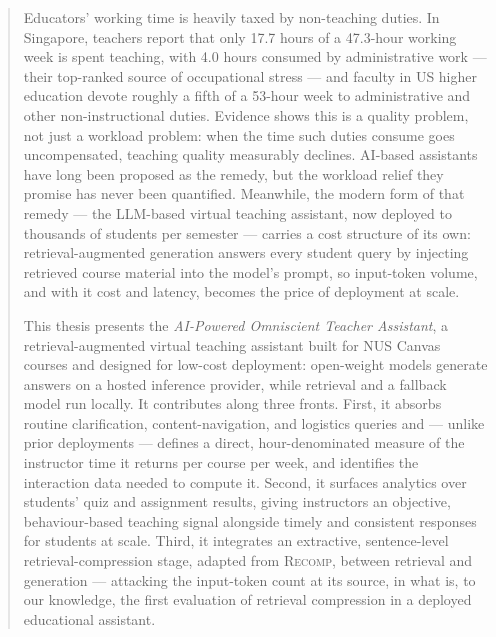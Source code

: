 \begin{abstract}

    Educators' working time is heavily taxed by non-teaching duties. In
    Singapore, teachers report that only 17.7 hours of a 47.3-hour working
    week is spent teaching, with 4.0 hours consumed by administrative work
    --- their top-ranked source of occupational stress --- and faculty in US
    higher education devote roughly a fifth of a 53-hour week to
    administrative and other non-instructional duties. Evidence
    shows this is a quality problem, not just a workload problem: when the
    time such duties consume goes uncompensated, teaching quality measurably
    declines. AI-based assistants have long been proposed as the remedy, but
    the workload relief they promise has never been quantified. Meanwhile,
    the modern form of that remedy --- the LLM-based virtual teaching
    assistant, now deployed to thousands of students per semester --- carries
    a cost structure of its own: retrieval-augmented generation answers every
    student query by injecting retrieved course material into the model's
    prompt, so input-token volume, and with it cost and latency, becomes the
    price of deployment at scale.

    This thesis presents the \emph{AI-Powered Omniscient Teacher Assistant},
    a retrieval-augmented virtual teaching assistant built for NUS Canvas
    courses and designed for low-cost deployment: open-weight
    models generate answers on a hosted inference provider, while retrieval
    and a fallback model run locally.
    It contributes along three fronts. First, it absorbs routine
    clarification, content-navigation, and logistics queries and --- unlike
    prior deployments --- defines a direct, hour-denominated measure of the
    instructor time it returns per course per week, and identifies the
    interaction data needed to compute it. Second, it surfaces analytics over students' quiz
    and assignment results, giving instructors an objective, behaviour-based
    teaching signal alongside timely and consistent responses for students at
    scale. Third, it integrates an extractive, sentence-level
    retrieval-compression stage, adapted from \textsc{Recomp}, between
    retrieval and generation --- attacking the input-token count at its
    source, in what is, to our knowledge, the first evaluation of retrieval
    compression in a deployed educational assistant.


\end{abstract}
